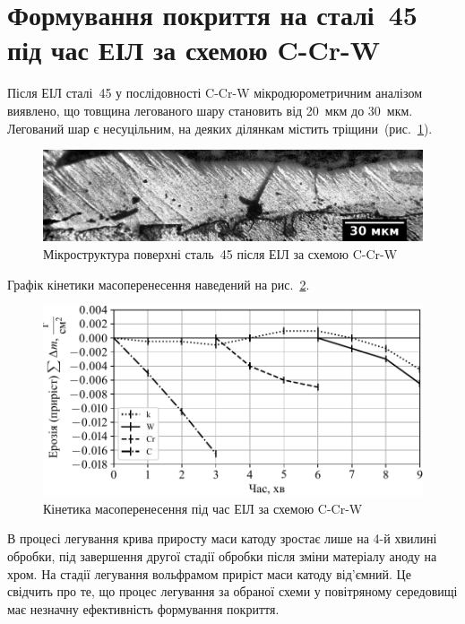\documentclass[a4paper,fontsize=14bp,ukrainian]{extreport}
\begin{document}
\section{Формування покриття на сталі~45 під час ЕІЛ за схемою C-Cr-W}

Після ЕІЛ сталі~45 у послідовності C-Cr-W мікродюрометричним аналізом виявлено, що товщина легованого шару становить від 20~мкм до 30~мкм. Легований шар є несуцільним, на деяких ділянкам містить тріщини~(рис.~\ref{fig:adapt_microstr_C-Cr-W}).

\begin{figure}[H]
\centering
\includegraphics[width=\textwidth]{adapt_gray_microstr_C-Cr-W.jpg}
\caption{Мікроструктура поверхні сталь~45 після ЕІЛ за схемою C-Cr-W}
\label{fig:adapt_microstr_C-Cr-W}
\end{figure}

Графік кінетики масоперенесення наведений на рис.~\ref{fig:plt_gravi_C-Cr-W}.

\begin{figure}[H]
\centering \includegraphics[]{plt_gravi_C-Cr-W.pdf}
\caption{Кінетика масоперенесення під час ЕІЛ за схемою C-Cr-W}
\label{fig:plt_gravi_C-Cr-W}
\end{figure}

В процесі легування крива приросту маси катоду зростає лише на 4-й хвилині обробки, під завершення другої стадії обробки після зміни матеріалу аноду на хром. На стадії легування вольфрамом приріст маси катоду від'ємний. Це свідчить про те, що процес легування за обраної схеми у повітряному середовищі має незначну ефективність формування покриття.
\end{document}

